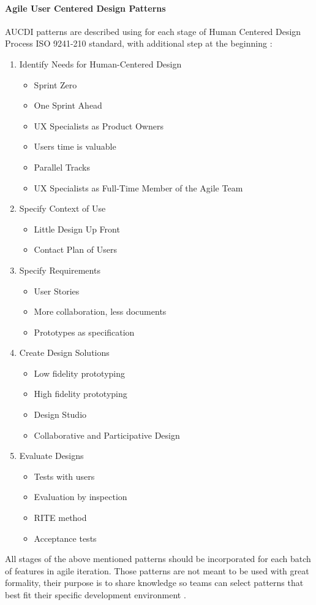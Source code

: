 \documentclass{article}
\begin{document}
\paragraph{Agile User Centered Design Patterns}
AUCDI patterns are described using for each stage of Human Centered Design Process ISO 9241-210 standard, with additional step at the beginning \cite{bertholdo2014agile}\cite{bertholdo2016agile}:
\begin{enumerate}
 \item Identify Needs for Human-Centered Design
 \begin{itemize}
     \item Sprint Zero
     \item One Sprint Ahead
     \item UX Specialists as Product Owners 
     \item Users time is valuable
     \item Parallel Tracks
     \item UX Specialists as Full-Time Member of the Agile Team
 \end{itemize}
 \item Specify Context of Use
 \begin{itemize}
     \item Little Design Up Front
     \item Contact Plan of Users
 \end{itemize}
 \item Specify Requirements
 \begin{itemize}
     \item User Stories
     \item More collaboration, less documents
     \item Prototypes as specification
 \end{itemize}
 \item Create Design Solutions
 \begin{itemize}
     \item Low fidelity prototyping
     \item High fidelity prototyping
     \item Design Studio
     \item Collaborative and Participative Design
 \end{itemize}
 \item Evaluate Designs
 \begin{itemize}
     \item Tests with users
     \item Evaluation by inspection
     \item RITE method
     \item Acceptance tests
 \end{itemize}
\end{enumerate}
All stages of the above mentioned patterns should be incorporated for each batch of features in agile iteration. Those patterns are not meant to be used with great formality, their purpose is to share knowledge so teams can select patterns that best fit their specific development environment \cite{bertholdo2016agile}.
\end{document}
